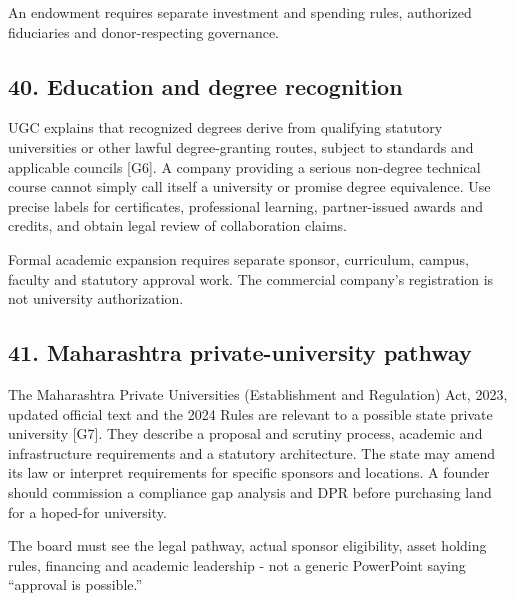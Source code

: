 An endowment requires separate investment and spending rules, authorized fiduciaries and donor-respecting governance.

\subsection{40. Education and degree recognition}

UGC explains that recognized degrees derive from qualifying statutory universities or other lawful degree-granting routes, subject to standards and applicable councils [G6]. A company providing a serious non-degree technical course cannot simply call itself a university or promise degree equivalence. Use precise labels for certificates, professional learning, partner-issued awards and credits, and obtain legal review of collaboration claims.

Formal academic expansion requires separate sponsor, curriculum, campus, faculty and statutory approval work. The commercial company's registration is not university authorization.

\subsection{41. Maharashtra private-university pathway}

The Maharashtra Private Universities (Establishment and Regulation) Act, 2023, updated official text and the 2024 Rules are relevant to a possible state private university [G7]. They describe a proposal and scrutiny process, academic and infrastructure requirements and a statutory architecture. The state may amend its law or interpret requirements for specific sponsors and locations. A founder should commission a compliance gap analysis and DPR before purchasing land for a hoped-for university.

The board must see the legal pathway, actual sponsor eligibility, asset holding rules, financing and academic leadership - not a generic PowerPoint saying ``approval is possible.''

